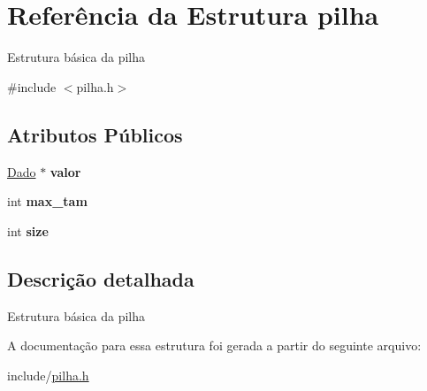 \hypertarget{structpilha}{}\section{Referência da Estrutura pilha}
\label{structpilha}


Estrutura básica da pilha ~\newline
  




{\ttfamily \#include $<$pilha.\+h$>$}

\subsection*{Atributos Públicos}
\begin{DoxyCompactItemize}
\item 
\mbox{\label{structpilha_a9fcf87d86e8f47d92d8e42341eb573b5}} 
\mbox{\hyperlink{pilha_8h_a5fc4fd986b888c946351fdd1c19309da}{Dado}} $\ast$ {\bfseries valor}
\item 
\mbox{\label{structpilha_a0b8a0715507edc1498e56c0007dc3d2d}} 
int {\bfseries max\+\_\+tam}
\item 
\mbox{\label{structpilha_ab6f3f9be9c7f94fd0630d4ab5552babe}} 
int {\bfseries size}
\end{DoxyCompactItemize}


\subsection{Descrição detalhada}
Estrutura básica da pilha ~\newline
 

A documentação para essa estrutura foi gerada a partir do seguinte arquivo\+:\begin{DoxyCompactItemize}
\item 
include/\mbox{\hyperlink{pilha_8h}{pilha.\+h}}\end{DoxyCompactItemize}
